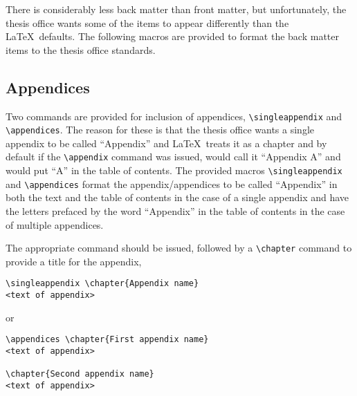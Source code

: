 \documentclass[11pt]{article}
\begin{document}
\begin{singlespace}
There is considerably less back matter than front matter, but unfortunately, the
thesis office wants some of the items to appear differently than the \LaTeX\
defaults.  The following macros are provided to format the back matter items
to the thesis office standards.

\subsection*{Appendices}

Two commands are provided for inclusion of appendices, \verb+\singleappendix+
and \verb+\appendices+.  The reason for these is that the thesis office wants a
single appendix to be called ``Appendix'' and \LaTeX\ treats it as a chapter and
by default if the \verb+\appendix+ command was issued, would call it ``Appendix
A'' and would put ``A'' in the table of contents.  The provided macros
\verb+\singleappendix+ and \verb+\appendices+ format the appendix/appendices to
be called ``Appendix'' in both the text and the table of contents in the case of
a single appendix and have the letters prefaced by the word ``Appendix'' in the
table of contents in the case of multiple appendices.  

The appropriate command
should be issued, followed by a \verb+\chapter+ command to provide a title for
the appendix, 

\begin{verbatim}
\singleappendix \chapter{Appendix name}
<text of appendix>
\end{verbatim}

\noindent or 

\begin{verbatim}
\appendices \chapter{First appendix name}
<text of appendix>

\chapter{Second appendix name}
<text of appendix>
\end{verbatim}


\end{singlespace}
\end{document}
